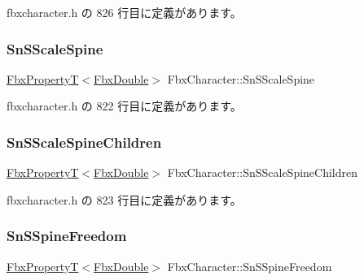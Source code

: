  fbxcharacter.\+h の 826 行目に定義があります。

\mbox{\label{class_fbx_character_a03480ecbbb70d96a8032870703c53014}} 
\subsubsection{\texorpdfstring{Sn\+S\+Scale\+Spine}{SnSScaleSpine}}
{\footnotesize\ttfamily \hyperlink{class_fbx_property_t}{Fbx\+PropertyT}$<$\hyperlink{fbxtypes_8h_a171e72a1c46fc15c1a6c9c31948c1c5b}{Fbx\+Double}$>$ Fbx\+Character\+::\+Sn\+S\+Scale\+Spine}



 fbxcharacter.\+h の 822 行目に定義があります。

\mbox{\label{class_fbx_character_a26540b88221a8923dbb0e7d1d20a9949}} 
\subsubsection{\texorpdfstring{Sn\+S\+Scale\+Spine\+Children}{SnSScaleSpineChildren}}
{\footnotesize\ttfamily \hyperlink{class_fbx_property_t}{Fbx\+PropertyT}$<$\hyperlink{fbxtypes_8h_a171e72a1c46fc15c1a6c9c31948c1c5b}{Fbx\+Double}$>$ Fbx\+Character\+::\+Sn\+S\+Scale\+Spine\+Children}



 fbxcharacter.\+h の 823 行目に定義があります。

\mbox{\label{class_fbx_character_a78286917bf8afed9e0d035202dd7ec95}} 
\subsubsection{\texorpdfstring{Sn\+S\+Spine\+Freedom}{SnSSpineFreedom}}
{\footnotesize\ttfamily \hyperlink{class_fbx_property_t}{Fbx\+PropertyT}$<$\hyperlink{fbxtypes_8h_a171e72a1c46fc15c1a6c9c31948c1c5b}{Fbx\+Double}$>$ Fbx\+Character\+::\+Sn\+S\+Spine\+Freedom}



